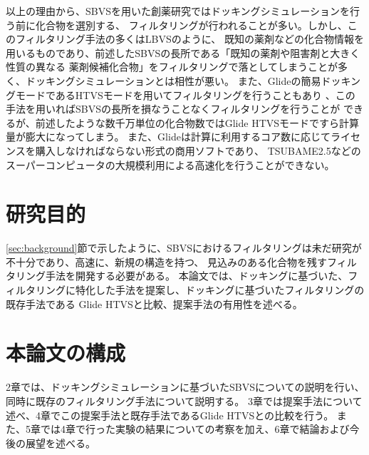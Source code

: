 以上の理由から、SBVSを用いた創薬研究ではドッキングシミュレーションを行う前に化合物を選別する、
フィルタリングが行われることが多い。しかし、このフィルタリング手法の多くはLBVSのように、
既知の薬剤などの化合物情報を用いるものであり、前述したSBVSの長所である「既知の薬剤や阻害剤と大きく性質の異なる
薬剤候補化合物」をフィルタリングで落としてしまうことが多く、ドッキングシミュレーションとは相性が悪い。
また、Glideの簡易ドッキングモードであるHTVSモードを用いてフィルタリングを行うこともあり
、この手法を用いればSBVSの長所を損なうことなくフィルタリングを行うことが
できるが、前述したような数千万単位の化合物数ではGlide HTVSモードですら計算量が膨大になってしまう。
また、Glideは計算に利用するコア数に応じてライセンスを購入しなければならない形式の商用ソフトであり、
TSUBAME2.5などのスーパーコンピュータの大規模利用による高速化を行うことができない。

\section{研究目的}
\ref{sec:background}節で示したように、SBVSにおけるフィルタリングは未だ研究が不十分であり、高速に、新規の構造を持つ、
見込みのある化合物を残すフィルタリング手法を開発する必要がある。
本論文では、ドッキングに基づいた、フィルタリングに特化した手法を提案し、ドッキングに基づいたフィルタリングの既存手法である
Glide HTVSと比較、提案手法の有用性を述べる。

\section{本論文の構成}
2章では、ドッキングシミュレーションに基づいたSBVSについての説明を行い、同時に既存のフィルタリング手法について説明する。
3章では提案手法について述べ、4章でこの提案手法と既存手法であるGlide HTVSとの比較を行う。
また、5章では4章で行った実験の結果についての考察を加え、6章で結論および今後の展望を述べる。